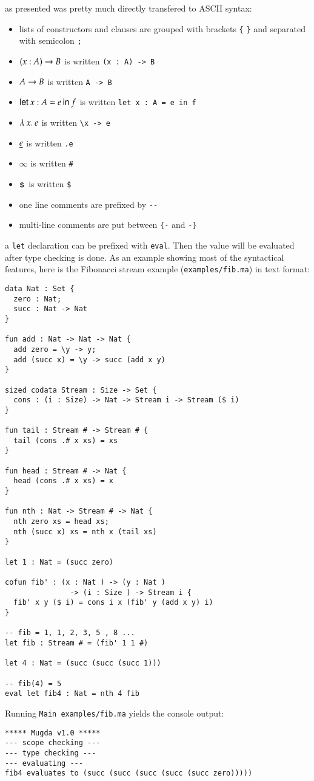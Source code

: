 \mugda as presented was pretty much directly transfered to ASCII syntax:
\begin{itemize}
\item
lists of constructors and clauses are grouped with brackets \texttt{\{} \texttt{\}} and separated with semicolon \texttt{;}
\item
$( x : A ) \rightarrow{B}$ is written \texttt{(x : A) -> B }
\item
$A \rightarrow B$ is written \texttt{A -> B}
\item
$\mathsf{let}\: x : A = e \: \mathsf{in}\:{f}$ is written \texttt{let x : A = e in f}
\item
$ \lambda\: x .\:e$ is written \verb+\x -> e +
\item
$ \underline{e}$ is written \texttt{.e} 
\item
$ \infty$ is written \texttt{\#} 
\item
$\mathsf{s}\,$ is written \texttt{\$}
\item
one line comments are prefixed by \verb+--+
\item
multi-line comments are put between \verb+{-+ and \verb+-}+
\end{itemize}
a \texttt{let} declaration can be prefixed with \texttt{eval}. Then the value will be evaluated after type checking is done.
As an example showing most of the syntactical features, here is the Fibonacci stream example (\texttt{examples/fib.ma}) in text format:
\begin{verbatim}
data Nat : Set {
  zero : Nat;
  succ : Nat -> Nat 
}

fun add : Nat -> Nat -> Nat {
  add zero = \y -> y;
  add (succ x) = \y -> succ (add x y)
}

sized codata Stream : Size -> Set {
  cons : (i : Size) -> Nat -> Stream i -> Stream ($ i)
}
 
fun tail : Stream # -> Stream # {
  tail (cons .# x xs) = xs
}

fun head : Stream # -> Nat {
  head (cons .# x xs) = x
}

fun nth : Nat -> Stream # -> Nat {
  nth zero xs = head xs;
  nth (succ x) xs = nth x (tail xs) 
}

let 1 : Nat = (succ zero)

cofun fib' : (x : Nat ) -> (y : Nat ) 
               -> (i : Size ) -> Stream i {
  fib' x y ($ i) = cons i x (fib' y (add x y) i)
} 

-- fib = 1, 1, 2, 3, 5 , 8 ...
let fib : Stream # = (fib' 1 1 #)

let 4 : Nat = (succ (succ (succ 1)))

-- fib(4) = 5 
eval let fib4 : Nat = nth 4 fib 
\end{verbatim}
Running \texttt{Main examples/fib.ma} yields the console output:
\begin{verbatim}
***** Mugda v1.0 *****
--- scope checking ---
--- type checking ---
--- evaluating ---
fib4 evaluates to (succ (succ (succ (succ (succ zero)))))
\end{verbatim}

